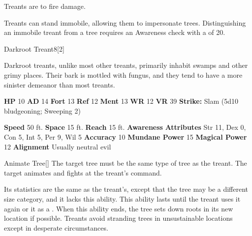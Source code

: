         Treants are  to fire damage.
      
        Treants can stand immobile, allowing them to impersonate trees.
        Distinguishing an immobile treant from a tree requires an Awareness check with a  of 20.
  

  \begin{monsubsection}{Darkroot Treant}{8}[2]
    \vspace{-1em}\vspace{-1em}
    \vspace{0em}

    
          Darkroot treants, unlike most other treants, primarily inhabit swamps and other grimy places.
          Their bark is mottled with fungus, and they tend to have a more sinister demeanor than most treants.
        

    \begin{spellcontent}
      \begin{spelltargetinginfo}
        \pari \textbf{HP} 10 \monsep
          \textbf{AD} 14 \monsep
          \textbf{Fort} 13 \monsep
          \textbf{Ref} 12 \monsep
          \textbf{Ment} 13
        \pari \textbf{WR} 12 \monsep
        \textbf{VR} 39
        \pari \textbf{Strike:}
            Slam  (5d10 bludgeoning; Sweeping 2)
      \end{spelltargetinginfo}
    \end{spellcontent}
    \begin{monsterfooter}
      \pari \textbf{Speed} 50 ft. \monsep
        \textbf{Space} 15 ft. \monsep
        \textbf{Reach} 15 ft.
      \pari \textbf{Awareness} 
      \pari \textbf{Attributes}
        Str 11, Dex 0,
        Con 5, Int 5,
        Per 9, Wil 5
      \pari \textbf{Accuracy} 10 \monsep
        \textbf{Mundane Power} 15 \monsep
      \textbf{Magical Power} 12
      \pari \textbf{Alignment} Usually neutral evil
    \end{monsterfooter}
  \end{monsubsection}
  \begin{freeability}{Animate Tree}[]
      The target tree must be the same type of tree as the treant.
        The target animates and fights at the treant's command.

        Its statistics are the same as the treant's, except that the tree may be a different size category, and it lacks this ability.
        This ability lasts until the treant uses it again or  it as a .
        When this ability ends, the tree sets down roots in its new location if possible.
        Treants avoid stranding trees in unsustainable locations except in desperate circumstances.
    \end{freeability}
  
